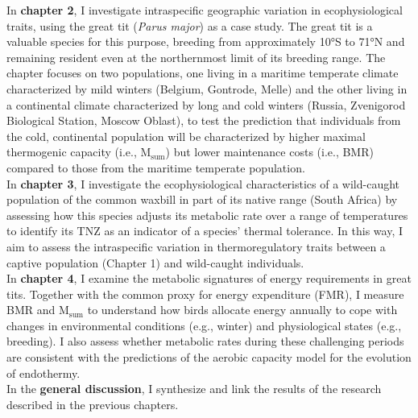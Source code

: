 \documentclass[10pt, twoside]{book} %
\begin{document}
In \textbf{chapter 2}, I investigate intraspecific geographic variation in ecophysiological traits, using the great tit (\textit{Parus major}) as a case study. The great tit is a valuable species for this purpose, breeding from approximately 10°S to 71°N and remaining resident even at the northernmost limit of its breeding range. The chapter focuses on two populations, one living in a maritime temperate climate characterized by mild winters (Belgium, Gontrode, Melle) and the other living in a continental climate characterized by long and cold winters (Russia, Zvenigorod Biological Station, Moscow Oblast), to test the prediction that individuals from the cold, continental population will be characterized by higher maximal thermogenic capacity (i.e., M$_{\text{sum}}$) but lower maintenance costs (i.e., BMR) compared to those from the maritime temperate population.\\

In \textbf{chapter 3}, I investigate the ecophysiological characteristics of a wild-caught population of the common waxbill in part of its native range (South Africa) by assessing how this species adjusts its metabolic rate over a range of temperatures to identify its TNZ as an indicator of a species' thermal tolerance. In this way, I aim to assess the intraspecific variation in thermoregulatory traits between a captive population (Chapter 1) and wild-caught individuals.\\

In \textbf{chapter 4}, I examine the metabolic signatures of energy requirements in great tits. Together with the common proxy for energy expenditure (FMR), I measure BMR and M$_{\text{sum}}$ to understand how birds allocate energy annually to cope with changes in environmental conditions (e.g., winter) and physiological states (e.g., breeding). I also assess whether metabolic rates during these challenging periods are consistent with the predictions of the aerobic capacity model for the evolution of endothermy.\\

In the \textbf{general discussion}, I synthesize and link the results of the research described in the previous chapters.











\end{document}
